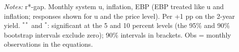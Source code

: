 \begin{flushleft}\footnotesize\textit{Notes:} r*-gap. Monthly system u, inflation, EBP (EBP treated like u and inflation; responses shown for u and the price level). Per +1 pp on the 2-year yield. $^{**}$ and $^{*}$: significant at the 5 and 10 percent levels (the 95\% and 90\% bootstrap intervals exclude zero); 90\% intervals in brackets. Obs = monthly observations in the equations.\end{flushleft}
\endgroup

